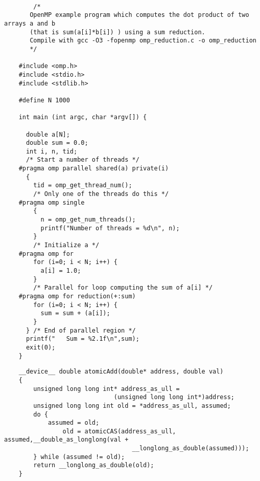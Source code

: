     \begin{lstlisting}

	    /* 
	   OpenMP example program which computes the dot product of two arrays a and b
	   (that is sum(a[i]*b[i]) ) using a sum reduction.
	   Compile with gcc -O3 -fopenmp omp_reduction.c -o omp_reduction
	   */
	
	#include <omp.h>
	#include <stdio.h>
	#include <stdlib.h>
	
	#define N 1000
	
	int main (int argc, char *argv[]) {
	  
	  double a[N];
	  double sum = 0.0;
	  int i, n, tid;
	  /* Start a number of threads */
	#pragma omp parallel shared(a) private(i) 
	  {
	    tid = omp_get_thread_num();
	    /* Only one of the threads do this */
	#pragma omp single
	    {
	      n = omp_get_num_threads();
	      printf("Number of threads = %d\n", n);
	    }
	    /* Initialize a */
	#pragma omp for 
	    for (i=0; i < N; i++) {
	      a[i] = 1.0;
	    }
	    /* Parallel for loop computing the sum of a[i] */
	#pragma omp for reduction(+:sum)
	    for (i=0; i < N; i++) {
	      sum = sum + (a[i]);
	    }
	  } /* End of parallel region */
	  printf("   Sum = %2.1f\n",sum);
	  exit(0);
	}

    \end{lstlisting} 
    
    
    
    
\begin{lstlisting}
	__device__ double atomicAdd(double* address, double val)
	{
	    unsigned long long int* address_as_ull =
	                          (unsigned long long int*)address;
	    unsigned long long int old = *address_as_ull, assumed;
	    do {
	        assumed = old;
	            old = atomicCAS(address_as_ull, assumed,__double_as_longlong(val +
	                               __longlong_as_double(assumed)));
	    } while (assumed != old);
	    return __longlong_as_double(old);
	}
\end{lstlisting} 
    
    
